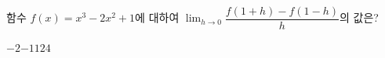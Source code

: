 함수 $f(x)=x^3-2x^2+1$에 대하여 $\displaystyle\lim_{h\to 0}\dfrac{f(1+h)-f(1-h)}{h}$의 값은?
\begin{choices32}{$-2$}{$-1$}{$1$}{$2$}{$4$}\end{choices32}
